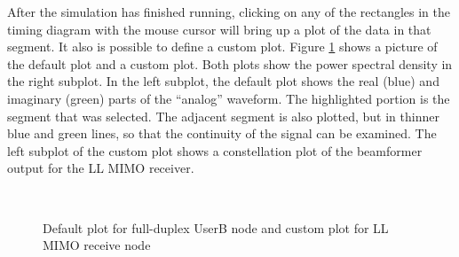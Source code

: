 After the simulation has finished running, clicking on any of the
rectangles in the timing diagram with the mouse cursor will bring up
a plot of the data in that segment.  It also is possible to define a
custom plot.  Figure \ref{fig:tdCallback} shows a picture of the
default plot and a custom plot.  Both plots show the power spectral
density in the right subplot.  In the left subplot, the default plot
shows the real (blue) and imaginary (green) parts of the ``analog''
waveform. The highlighted portion is the segment that was selected.
The adjacent segment is also plotted, but in thinner blue and green
lines, so that the continuity of the signal can be examined.  The
left subplot of the custom plot shows a constellation plot of the
beamformer output for the LL MIMO receiver.

\begin{figure}[h]
\centering \mbox{
     \quad
     \quad
    }
\caption{Default plot for full-duplex UserB node and custom plot for
LL MIMO receive node} \label{fig:tdCallback}
\end{figure}

